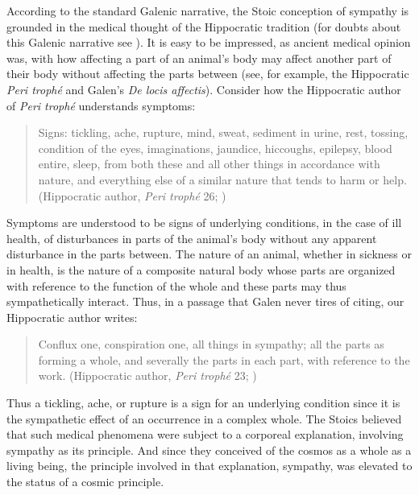 According to the standard Galenic narrative, the Stoic conception of sympathy is grounded in the medical thought of the Hippocratic tradition (for doubts about this Galenic narrative see \citealt{Holmes:2015aa}). It is easy to be impressed, as ancient medical opinion was, with how affecting a part of an animal's body may affect another part of their body without affecting the parts between (see, for example, the Hippocratic \emph{Peri troph\'{e}} and Galen's \emph{De locis affectis}). Consider how the Hippocratic author of \emph{Peri troph\'{e}} understands symptoms: 
\begin{quote}
	Signs: tickling, ache, rupture, mind, sweat, sediment in urine, rest, tossing, condition of the eyes, imaginations, jaundice, hiccoughs, epilepsy, blood entire, sleep, from both these and all other things in accordance with nature, and everything else of a similar nature that tends to harm or help. (Hippocratic author, \emph{Peri troph\'{e}} 26; \citealt[351]{Jones:1957aa})
\end{quote}
Symptoms are understood to be signs of underlying conditions, in the case of ill health, of disturbances in parts of the animal's body without any apparent disturbance in the parts between. The nature of an animal, whether in sickness or in health, is the nature of a composite natural body whose parts are organized with reference to the function of the whole and these parts may thus sympathetically interact. Thus, in a passage that Galen never tires of citing, our Hippocratic author writes:
\begin{quote}
	Conflux one, conspiration one, all things in sympathy; all the parts as forming a whole, and severally the parts in each part, with reference to the work. (Hippocratic author, \emph{Peri troph\'{e}} 23; \citealt[351]{Jones:1957aa})
\end{quote}
Thus a tickling, ache, or rupture is a sign for an underlying condition since it is the sympathetic effect of an occurrence in a complex whole. The Stoics believed that such medical phenomena were subject to a corporeal explanation, involving sympathy as its principle. And since they conceived of the cosmos as a whole as a living being, the principle involved in that explanation, sympathy, was elevated to the status of a cosmic principle.

